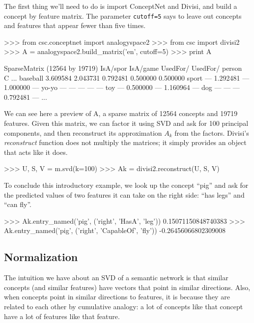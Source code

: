\documentclass[11pt]{article}
\begin{document}
The first thing we'll need to do is import ConceptNet and Divisi, and build a
concept by feature matrix. The parameter {\tt cutoff=5} says to leave out
concepts and features that appear fewer than five times.

\begin{python}
>>> from csc.conceptnet import analogyspace2
>>> from csc import divisi2
>>> A = analogyspace2.build_matrix('en', cutoff=5)
>>> print A
\end{python}
\newpage
\begin{python}
SparseMatrix (12564 by 19719)
         IsA/spor   IsA/game   UsedFor/   UsedFor/   person\\C ...
baseball 3.609584   2.043731   0.792481   0.500000   0.500000  
sport       ---     1.292481      ---     1.000000      ---    
yo-yo       ---        ---        ---        ---        ---    
toy         ---     0.500000      ---     1.160964      ---    
dog         ---        ---        ---     0.792481      ---    
...
\end{python}

We can see here a preview of A, a sparse matrix of 12564 concepts and 19719
features.  Given this matrix, we can factor it using SVD and ask for 100
principal components, and then reconstruct its approximation $A_k$ from the
factors.  Divisi's {\em reconstruct} function does not multiply the matrices;
it simply provides an object that acts like it does.

\begin{python}
>>> U, S, V = m.svd(k=100)
>>> Ak = divisi2.reconstruct(U, S, V)
\end{python}

To conclude this introductory example, we look up the concept ``pig'' and ask
for the predicted values of two features it can take on the right side: ``has
legs'' and ``can fly''.

\begin{python}
>>> Ak.entry_named('pig', ('right', 'HasA', 'leg'))
0.15071150848740383
>>> Ak.entry_named('pig', ('right', 'CapableOf', 'fly'))
-0.26456066802309008
\end{python}

\subsection{Normalization}

The intuition we have about an SVD of a semantic network is that similar
concepts (and similar features) have vectors that point in similar directions.
Also, when concepts point in similar directions to features, it is because they
are related to each other by cumulative analogy: a lot of concepts like that
concept have a lot of features like that feature.
\end{document}
